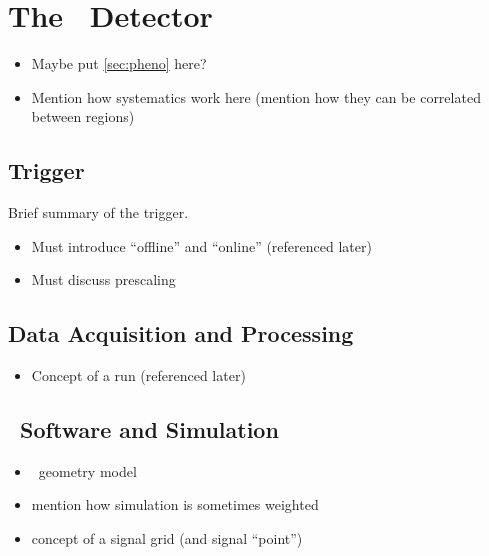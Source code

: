 
\section{The \atlas\ Detector}
\label{sec:atlas}
\begin{itemize}
\item Maybe put \cref{sec:pheno} here?
\item Mention how systematics work here (mention how they can be correlated between regions)
\end{itemize}
\subsection{Trigger}
\label{sec:trigger}
Brief summary of the trigger.
\begin{itemize}
\item Must introduce ``offline'' and ``online'' (referenced later)
\item Must discuss prescaling
\end{itemize}
\subsection{Data Acquisition and Processing}
\begin{itemize}
\item Concept of a run (referenced later)
\end{itemize}
\subsection{\atlas\ Software and Simulation}
\label{sec:software}
\begin{itemize}
\item \atlas\ geometry model
\item mention how simulation is sometimes weighted
\item concept of a signal grid (and signal ``point'')
\end{itemize}
